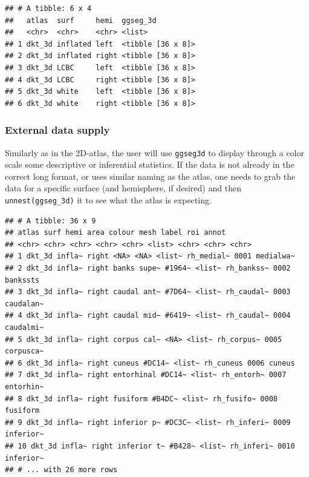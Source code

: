 \documentclass[fleqn,10pt]{wlpeerj} %
\newenvironment{Shaded}{\begin{snugshade}}{\end{snugshade}}
\newcommand{\KeywordTok}[1]{\textcolor[rgb]{0.13,0.29,0.53}{\textbf{#1}}}
\newcommand{\NormalTok}[1]{#1}
\newcommand{\OperatorTok}[1]{\textcolor[rgb]{0.81,0.36,0.00}{\textbf{#1}}}
\newcommand{\StringTok}[1]{\textcolor[rgb]{0.31,0.60,0.02}{#1}}
\begin{document}
\begin{verbatim}
## # A tibble: 6 x 4
##   atlas  surf     hemi  ggseg_3d         
##   <chr>  <chr>    <chr> <list>           
## 1 dkt_3d inflated left  <tibble [36 x 8]>
## 2 dkt_3d inflated right <tibble [36 x 8]>
## 3 dkt_3d LCBC     left  <tibble [36 x 8]>
## 4 dkt_3d LCBC     right <tibble [36 x 8]>
## 5 dkt_3d white    left  <tibble [36 x 8]>
## 6 dkt_3d white    right <tibble [36 x 8]>
\end{verbatim}

\normalsize

\hypertarget{external-data-supply}{%
\subsubsection{External data supply}\label{external-data-supply}}

Similarly as in the 2D-atlas, the user will use \texttt{ggseg3d} to display through a color scale some descriptive or inferential statistics.
If the data is not already in the correct long format, or uses similar naming as the atlas, one needs to grab the data for a specific surface (and hemisphere, if desired) and then \texttt{unnest(ggseg\_3d)} it to see what the atlas is expecting.

\begin{Shaded}
\end{Shaded}

\begin{verbatim}
## # A tibble: 36 x 9
## atlas surf hemi area colour mesh label roi annot
## <chr> <chr> <chr> <chr> <chr> <list> <chr> <chr> <chr>
## 1 dkt_3d infla~ right <NA> <NA> <list~ rh_medial~ 0001 medialwa~
## 2 dkt_3d infla~ right banks supe~ #1964~ <list~ rh_bankss~ 0002
bankssts
## 3 dkt_3d infla~ right caudal ant~ #7D64~ <list~ rh_caudal~ 0003
caudalan~
## 4 dkt_3d infla~ right caudal mid~ #6419~ <list~ rh_caudal~ 0004
caudalmi~
## 5 dkt_3d infla~ right corpus cal~ <NA> <list~ rh_corpus~ 0005
corpusca~
## 6 dkt_3d infla~ right cuneus #DC14~ <list~ rh_cuneus 0006 cuneus
## 7 dkt_3d infla~ right entorhinal #DC14~ <list~ rh_entorh~ 0007
entorhin~
## 8 dkt_3d infla~ right fusiform #B4DC~ <list~ rh_fusifo~ 0008
fusiform
## 9 dkt_3d infla~ right inferior p~ #DC3C~ <list~ rh_inferi~ 0009
inferior~
## 10 dkt_3d infla~ right inferior t~ #B428~ <list~ rh_inferi~ 0010
inferior~
## # ... with 26 more rows
\end{verbatim}
\end{document}

